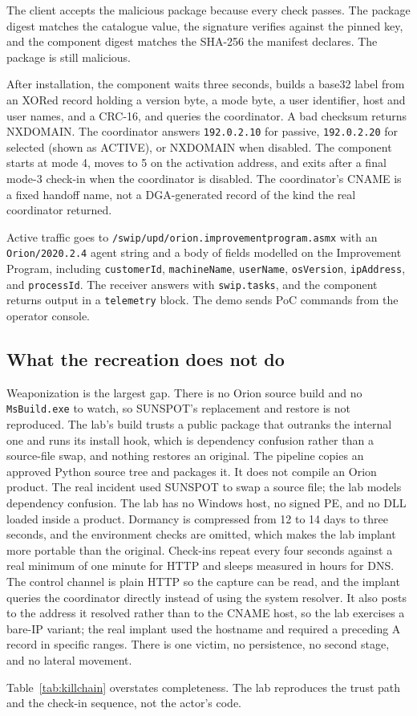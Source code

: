 The client accepts the malicious package because every check passes. The package digest matches the catalogue value, the signature verifies against the pinned key, and the component digest matches the SHA-256 the manifest declares. The package is still malicious.

After installation, the component waits three seconds, builds a base32 label from an XORed record holding a version byte, a mode byte, a user identifier, host and user names, and a CRC-16, and queries the coordinator. A bad checksum returns NXDOMAIN. The coordinator answers \texttt{192.0.2.10} for passive, \texttt{192.0.2.20} for selected (shown as ACTIVE), or NXDOMAIN when disabled. The component starts at mode 4, moves to 5 on the activation address, and exits after a final mode-3 check-in when the coordinator is disabled. The coordinator's CNAME is a fixed handoff name, not a DGA-generated record of the kind the real coordinator returned.

Active traffic goes to \texttt{/swip/upd/orion.improvementprogram.asmx} with an \texttt{Orion/2020.2.4} agent string and a body of fields modelled on the Improvement Program, including \texttt{customerId}, \texttt{machineName}, \texttt{userName}, \texttt{osVersion}, \texttt{ipAddress}, and \texttt{processId}. The receiver answers with \texttt{swip.tasks}, and the component returns output in a \texttt{telemetry} block. The demo sends PoC commands from the operator console.

\subsection{What the recreation does not do}

Weaponization is the largest gap. There is no Orion source build and no \texttt{MsBuild.exe} to watch, so SUNSPOT's replacement and restore is not reproduced. The lab's build trusts a public package that outranks the internal one and runs its install hook, which is dependency confusion rather than a source-file swap, and nothing restores an original. The pipeline copies an approved Python source tree and packages it. It does not compile an Orion product. The real incident used SUNSPOT to swap a source file; the lab models dependency confusion. The lab has no Windows host, no signed PE, and no DLL loaded inside a product. Dormancy is compressed from 12 to 14 days to three seconds, and the environment checks are omitted, which makes the lab implant more portable than the original. Check-ins repeat every four seconds against a real minimum of one minute for HTTP and sleeps measured in hours for DNS. The control channel is plain HTTP so the capture can be read, and the implant queries the coordinator directly instead of using the system resolver. It also posts to the address it resolved rather than to the CNAME host, so the lab exercises a bare-IP variant; the real implant used the hostname and required a preceding A record in specific ranges. There is one victim, no persistence, no second stage, and no lateral movement.

Table~\ref{tab:killchain} overstates completeness. The lab reproduces the trust path and the check-in sequence, not the actor's code.
